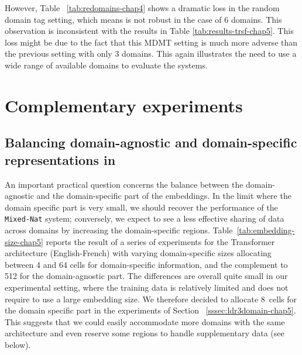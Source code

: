 However, Table ~\ref{tab:redomains-chap4} shows a dramatic loss in the random domain tag setting, which means  is not robust in the case of 6 domains. This observation is inconsistent with the results in Table \ref{tab:results-trsf-chap5}. This loss might be due to the fact that this MDMT setting is much more adverse than the previous setting with only 3 domains. This again illustrates the need to use a wide range of available domains to evaluate the systems.

\section{Complementary experiments\label{sec:Discussion-chap5}}
\subsection{Balancing domain-agnostic and domain-specific representations in \label{secc:region_size-chap5}}
An important practical question concerns the balance between the domain-agnostic and the domain-specific part of the embeddings. 
In the limit where the domain specific part is very small, we should recover the performance of the \texttt{Mixed-Nat} system; 
conversely, we expect to see a less effective sharing of data across domains by increasing the domain-specific regions. 
Table~\ref{tab:embedding-size-chap5} reports the result of  a series of experiments for the Transformer architecture (English-French) with varying domain-specific sizes allocating between 4 and 64 cells for domain-specific information, and the complement to 512 for the domain-agnostic part. 
The differences are overall quite small in our experimental setting, where the training data is relatively limited and does not require to use a large embedding size. 
We therefore decided to allocate $8$~cells for the domain specific part in the experiments of Section ~\ref{sssec:ldr3domain-chap5}. 
This suggests that we could easily accommodate more domains with the same architecture and even reserve some regions to handle supplementary data (see below). %

